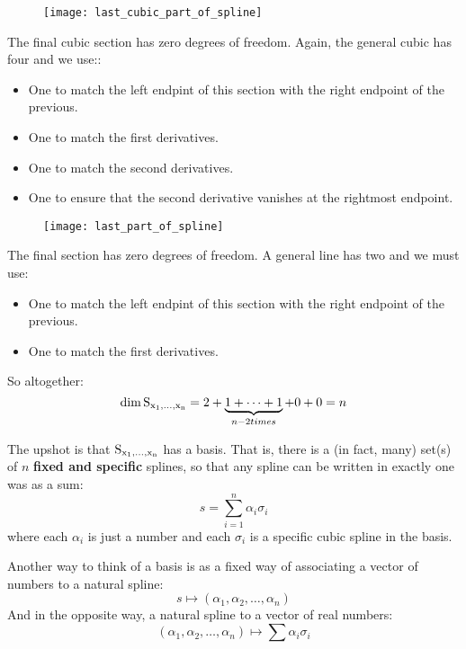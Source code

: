 \begin{frame}
	\begin{figure}
    \texttt{[image: last\_cubic\_part\_of\_spline]}
	\end{figure}
  The final cubic section has zero degrees of freedom.  Again, the general cubic has four and we use::
  \begin{itemize}
    \item One to match the left endpint of this section with the right endpoint of the previous.
    \item One to match the first derivatives.
    \item One to match the second derivatives.
    \item One to ensure that the second derivative vanishes at the rightmost endpoint.
  \end{itemize}
\end{frame}
%
%
\begin{frame}
	\begin{figure}
    \texttt{[image: last\_part\_of\_spline]}
	\end{figure}
  The final section has zero degrees of freedom.  A general line has two and we must use:
  \begin{itemize}
    \item One to match the left endpint of this section with the right endpoint of the previous.
    \item One to match the first derivatives.
  \end{itemize}
\end{frame}
%
%
\begin{frame}
  So altogether:
  $$ \dim \operatorname*{S_{x_1, \ldots, x_n}} = 2 + \underbrace{1 + \cdots + 1}_{n-2 times} + 0 + 0 = n $$
\end{frame}
%
%
\begin{frame}
  The upshot is that $\operatorname*{S_{x_1, \ldots, x_n}}$ has a basis.  That is, there is a (in fact, many) set(s) of $n$ \textbf{fixed and specific} splines, so that any spline can be written in exactly one was as a sum:
  $$ s = \sum_{i=1}^n \alpha_i \sigma_i $$
where each $\alpha_i$ is just a number and each $\sigma_i$ is a specific cubic spline in the basis.
\end{frame}
%
%
\begin{frame}
  Another way to think of a basis is as a fixed way of associating a vector of numbers to a natural spline:
  $$ s \mapsto (\alpha_1, \alpha_2, \ldots, \alpha_n) $$
And in the opposite way, a natural spline to a vector of real numbers:
  $$ (\alpha_1, \alpha_2, \ldots, \alpha_n) \mapsto \sum \alpha_i \sigma_i $$
\end{frame}
